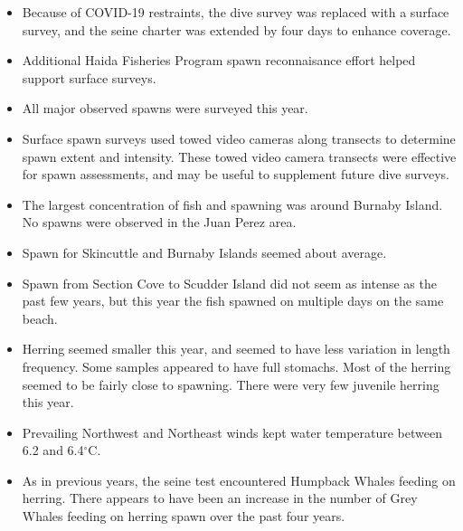 \begin{itemize}

\item Because of COVID-19 restraints, the dive survey was replaced with a surface survey, and the seine charter was extended by four days to enhance coverage.

\item Additional Haida Fisheries Program spawn reconnaisance effort helped support surface surveys.

\item All major observed spawns were surveyed this year.

\item Surface spawn surveys used towed video cameras along transects to determine spawn extent and intensity.
These towed video camera transects were effective for spawn assessments, and may be useful to supplement future dive surveys.

\item The largest concentration of fish and spawning was around Burnaby Island.
No spawns were observed in the Juan Perez area.

\item Spawn for Skincuttle and Burnaby Islands seemed about average.

\item Spawn from Section Cove to Scudder Island did not seem as intense as the past few years,
but this year the fish spawned on multiple days on the same beach.

\item Herring seemed smaller this year, and seemed to have less variation in length frequency.
Some samples appeared to have full stomachs.
Most of the herring seemed to be fairly close to spawning.
There were very few juvenile herring this year.

\item Prevailing Northwest and Northeast winds kept water temperature between 6.2 and 6.4$^\circ\text{C}$.

\item As in previous years, the seine test encountered Humpback Whales feeding on herring.
There appears to have been an increase in the number of Grey Whales feeding on herring spawn over the past four years.

\end{itemize}
